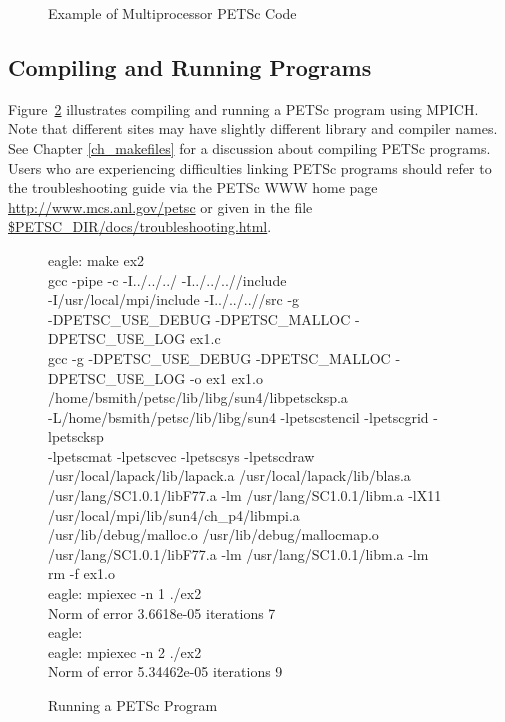 \begin{figure}[H]
{\footnotesize
{}
}
\nobreak
\caption{Example of Multiprocessor PETSc Code}
\label{fig_example2}
\end{figure}

\subsection*{Compiling and Running Programs}

Figure~\ref{fig_exrun} illustrates compiling and running a PETSc program
using MPICH.  Note that different sites may have slightly different
library and compiler names.  See Chapter \ref{ch_makefiles}
for a discussion about compiling PETSc programs.
Users who are experiencing difficulties linking PETSc programs should 
refer to the troubleshooting guide via the PETSc WWW home page 
\href{http://www.mcs.anl.gov/petsc}{http://www.mcs.anl.gov/petsc} or
given in the file \href{troubleshooting.html}{\${PETSC\_DIR}/docs/troubleshooting.html}.

\begin{figure}[H]
{\small
\begin{tabbing}
   eagle: make ex2\\
   gcc  -pipe -c  -I../../../  -I../../..//include   \\
       -I/usr/local/mpi/include  -I../../..//src -g \\
       -DPETSC\_USE\_DEBUG -DPETSC\_MALLOC -DPETSC\_USE\_LOG ex1.c\\
   gcc -g -DPETSC\_USE\_DEBUG -DPETSC\_MALLOC -DPETSC\_USE\_LOG -o ex1 ex1.o \\
      /home/bsmith/petsc/lib/libg/sun4/libpetscksp.a \\
      -L/home/bsmith/petsc/lib/libg/sun4 -lpetscstencil -lpetscgrid  -lpetscksp \\
      -lpetscmat  -lpetscvec -lpetscsys -lpetscdraw  \\
      /usr/local/lapack/lib/lapack.a /usr/local/lapack/lib/blas.a \\
      /usr/lang/SC1.0.1/libF77.a -lm /usr/lang/SC1.0.1/libm.a -lX11 \\
      /usr/local/mpi/lib/sun4/ch\_p4/libmpi.a\\
      /usr/lib/debug/malloc.o /usr/lib/debug/mallocmap.o  \\
      /usr/lang/SC1.0.1/libF77.a -lm /usr/lang/SC1.0.1/libm.a -lm\\
   rm -f ex1.o\\
   eagle: mpiexec -n 1 ./ex2\\
   Norm of error 3.6618e-05 iterations 7\\
   eagle:\\
   eagle: mpiexec -n 2 ./ex2\\
   Norm of error 5.34462e-05 iterations 9
\end{tabbing}
}
\nobreak
\caption{Running a PETSc Program}
\label{fig_exrun}
\end{figure}

